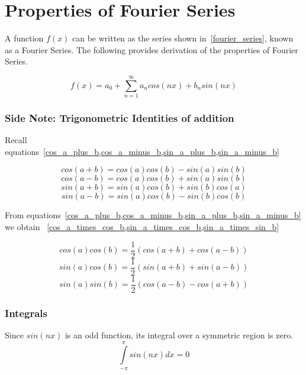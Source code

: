\documentclass[a4paper]{article}
\author{Emil Kerimov}
\numberwithin{equation}{subsection}
\begin{document}
\section{Properties of Fourier Series}\label{fourier}
A function $f(x)$ can be written as the series shown in~\cref{fourier_series}, known as a Fourier Series. The following provides derivation of the properties of Fourier Series.

\begin{equation}\label{fourier_series}
f(x) = a_0 + \sum\limits_{n=1}^{\infty} a_n cos(n x) + b_n sin(n x)
\end{equation}


\subsubsection{Side Note: Trigonometric Identities of addition}\label{trig_identities_addittion}
Recall equations~\cref{cos_a_plus_b,cos_a_minus_b,sin_a_plus_b,sin_a_minus_b}

\begin{equation}\label{cos_a_plus_b}
cos(a+b) = cos(a) cos(b) - sin(a) sin(b)
\end{equation}
\begin{equation}\label{cos_a_minus_b}
cos(a-b) = cos(a) cos(b) + sin(a) sin(b)
\end{equation}
\begin{equation}\label{sin_a_plus_b}
sin(a+b) = sin(a) cos(b) + sin(b) cos(a)
\end{equation}
\begin{equation}\label{sin_a_minus_b}
sin(a-b) = sin(a) cos(b) - sin(b) cos(b)
\end{equation}

From equations~\cref{cos_a_plus_b,cos_a_minus_b,sin_a_plus_b,sin_a_minus_b} we obtain ~\cref{cos_a_times_cos_b,sin_a_times_cos_b,sin_a_times_sin_b}

\begin{equation}\label{cos_a_times_cos_b}
cos(a) cos(b) = \frac{1}{2} (cos(a+b) + cos(a-b))
\end{equation}
\begin{equation}\label{sin_a_times_cos_b}
sin(a) cos(b)  = \frac{1}{2}(sin(a+b) + sin(a-b))
\end{equation}
\begin{equation}\label{sin_a_times_sin_b}
sin(a) sin(b)  = \frac{1}{2}(cos(a-b) - cos(a+b))
\end{equation}

\subsubsection{Integrals}
Since $sin(n x)$ is an odd function, its integral  over a symmetric region is zero.
\begin{equation}\label{int_sin_nx}
\int \limits_{-\pi}^{\pi} sin(n x) dx = 0
\end{equation}
\end{document}
